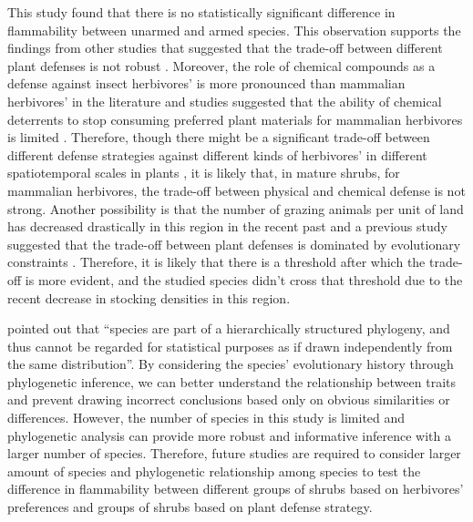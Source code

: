 \documentclass{ttuthes2007}
\begin{document}
This study found that there is no statistically significant difference in flammability between unarmed and armed species. %
This observation supports the findings from other studies that suggested that the trade-off between different plant defenses is not robust \citep{steward1988there, koricheva2004meta, moles2013correlations}. Moreover, the role of chemical compounds as a defense against insect herbivores' \citep{herms1992dilemma, ohgushi2005indirect} is more pronounced than mammalian herbivores' in the literature and studies suggested that the ability of chemical deterrents to stop consuming preferred plant materials for mammalian herbivores is limited \citep{cooper1985condensed, cooper1988foliage}. Therefore, though there might be a significant trade-off between different defense strategies against different kinds of herbivores' in different spatiotemporal scales in plants \citep{eck2001trade, wigley2015mammal, dostalek2016trade}, it is likely that, in mature shrubs, for mammalian herbivores, the trade-off between physical and chemical defense is not strong. Another possibility is that the number of grazing animals per unit of land has decreased drastically in this region in the recent past \citep{wilcox2012historicalgrazing2} and a previous study suggested that the trade-off between plant defenses is dominated by evolutionary constraints \citep{eichenberg2015trade}. Therefore, it is likely that there is a threshold after which the trade-off is more evident, and the studied species didn’t cross that threshold due to the recent decrease in stocking densities in this region.


\citet{felsenstein1985phylogenies} pointed out that ``species are part
of a  hierarchically structured phylogeny, and thus cannot be regarded for statistical purposes as if drawn independently from the same distribution''. By considering the species' evolutionary history through phylogenetic inference, we can better understand the relationship between traits and prevent drawing incorrect conclusions based only on obvious similarities or differences. However, the number of species in this study is limited and phylogenetic analysis can provide more robust and informative inference with a larger number of species. Therefore, future studies are required to consider larger amount of species and phylogenetic relationship among species to test the difference in flammability between different
groups of shrubs based on herbivores’ preferences and groups of shrubs based on plant defense strategy.

\backmatter



\end{document}
